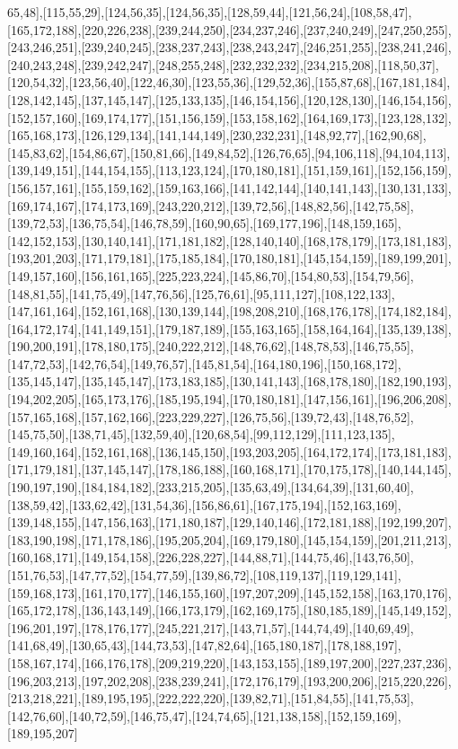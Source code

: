 65,48],[115,55,29],[124,56,35],[124,56,35],[128,59,44],[121,56,24],[108,58,47],[165,172,188],[220,226,238],[239,244,250],[234,237,246],[237,240,249],[247,250,255],[243,246,251],[239,240,245],[238,237,243],[238,243,247],[246,251,255],[238,241,246],[240,243,248],[239,242,247],[248,255,248],[232,232,232],[234,215,208],[118,50,37],[120,54,32],[123,56,40],[122,46,30],[123,55,36],[129,52,36],[155,87,68],[167,181,184],[128,142,145],[137,145,147],[125,133,135],[146,154,156],[120,128,130],[146,154,156],[152,157,160],[169,174,177],[151,156,159],[153,158,162],[164,169,173],[123,128,132],[165,168,173],[126,129,134],[141,144,149],[230,232,231],[148,92,77],[162,90,68],[145,83,62],[154,86,67],[150,81,66],[149,84,52],[126,76,65],[94,106,118],[94,104,113],[139,149,151],[144,154,155],[113,123,124],[170,180,181],[151,159,161],[152,156,159],[156,157,161],[155,159,162],[159,163,166],[141,142,144],[140,141,143],[130,131,133],[169,174,167],[174,173,169],[243,220,212],[139,72,56],[148,82,56],[142,75,58],[139,72,53],[136,75,54],[146,78,59],[160,90,65],[169,177,196],[148,159,165],[142,152,153],[130,140,141],[171,181,182],[128,140,140],[168,178,179],[173,181,183],[193,201,203],[171,179,181],[175,185,184],[170,180,181],[145,154,159],[189,199,201],[149,157,160],[156,161,165],[225,223,224],[145,86,70],[154,80,53],[154,79,56],[148,81,55],[141,75,49],[147,76,56],[125,76,61],[95,111,127],[108,122,133],[147,161,164],[152,161,168],[130,139,144],[198,208,210],[168,176,178],[174,182,184],[164,172,174],[141,149,151],[179,187,189],[155,163,165],[158,164,164],[135,139,138],[190,200,191],[178,180,175],[240,222,212],[148,76,62],[148,78,53],[146,75,55],[147,72,53],[142,76,54],[149,76,57],[145,81,54],[164,180,196],[150,168,172],[135,145,147],[135,145,147],[173,183,185],[130,141,143],[168,178,180],[182,190,193],[194,202,205],[165,173,176],[185,195,194],[170,180,181],[147,156,161],[196,206,208],[157,165,168],[157,162,166],[223,229,227],[126,75,56],[139,72,43],[148,76,52],[145,75,50],[138,71,45],[132,59,40],[120,68,54],[99,112,129],[111,123,135],[149,160,164],[152,161,168],[136,145,150],[193,203,205],[164,172,174],[173,181,183],[171,179,181],[137,145,147],[178,186,188],[160,168,171],[170,175,178],[140,144,145],[190,197,190],[184,184,182],[233,215,205],[135,63,49],[134,64,39],[131,60,40],[138,59,42],[133,62,42],[131,54,36],[156,86,61],[167,175,194],[152,163,169],[139,148,155],[147,156,163],[171,180,187],[129,140,146],[172,181,188],[192,199,207],[183,190,198],[171,178,186],[195,205,204],[169,179,180],[145,154,159],[201,211,213],[160,168,171],[149,154,158],[226,228,227],[144,88,71],[144,75,46],[143,76,50],[151,76,53],[147,77,52],[154,77,59],[139,86,72],[108,119,137],[119,129,141],[159,168,173],[161,170,177],[146,155,160],[197,207,209],[145,152,158],[163,170,176],[165,172,178],[136,143,149],[166,173,179],[162,169,175],[180,185,189],[145,149,152],[196,201,197],[178,176,177],[245,221,217],[143,71,57],[144,74,49],[140,69,49],[141,68,49],[130,65,43],[144,73,53],[147,82,64],[165,180,187],[178,188,197],[158,167,174],[166,176,178],[209,219,220],[143,153,155],[189,197,200],[227,237,236],[196,203,213],[197,202,208],[238,239,241],[172,176,179],[193,200,206],[215,220,226],[213,218,221],[189,195,195],[222,222,220],[139,82,71],[151,84,55],[141,75,53],[142,76,60],[140,72,59],[146,75,47],[124,74,65],[121,138,158],[152,159,169],[189,195,207]